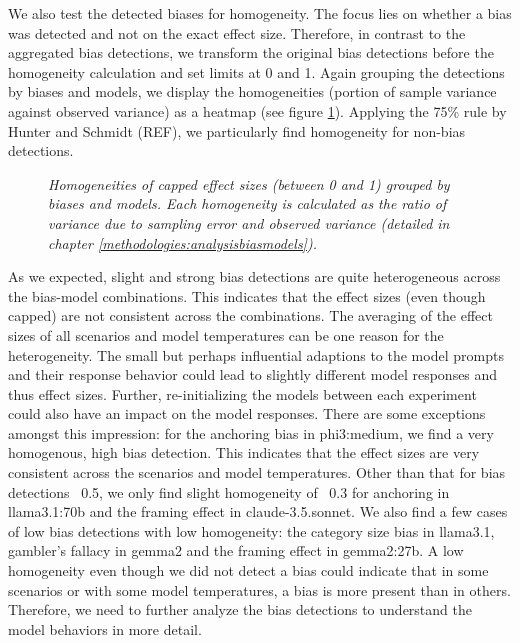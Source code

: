 \par We also test the detected biases for homogeneity. The focus lies on whether a bias was detected and not on the exact effect size. Therefore, in contrast to the aggregated bias detections, we transform the original bias detections before the homogeneity calculation and set limits at 0 and 1. Again grouping the detections by biases and models, we display the homogeneities (portion of sample variance against observed variance) as a heatmap (see figure \ref{fig:homogeneity-heatmap}). Applying the 75\% rule by Hunter and Schmidt (REF), we particularly find homogeneity for non-bias detections.

\begin{figure}[htbp]
    \centering
    
    \caption[Heatmap of homogeneities grouped by biases and models]{\centering \textit{Homogeneities of capped effect sizes (between 0 and 1) grouped by biases and models. Each homogeneity is calculated as the ratio of variance due to sampling error and observed variance (detailed in chapter \ref{methodologies:analysisbiasmodels}).}}
    \label{fig:homogeneity-heatmap}
\end{figure}

\par As we expected, slight and strong bias detections are quite heterogeneous across the bias-model combinations. This indicates that the effect sizes (even though capped) are not consistent across the combinations. The averaging of the effect sizes of all scenarios and model temperatures can be one reason for the heterogeneity. The small but perhaps influential adaptions to the model prompts and their response behavior could lead to slightly different model responses and thus effect sizes. Further, re-initializing the models between each experiment could also have an impact on the model responses. There are some exceptions amongst this impression: for the anchoring bias in phi3:medium, we find a very homogenous, high bias detection. This indicates that the effect sizes are very consistent across the scenarios and model temperatures. Other than that for bias detections \geq\, 0.5, we only find slight homogeneity of \geq\, 0.3 for anchoring in llama3.1:70b and the framing effect in claude-3.5.sonnet. We also find a few cases of low bias detections with low homogeneity: the category size bias in llama3.1, gambler's fallacy in gemma2 and the framing effect in gemma2:27b. A low homogeneity even though we did not detect a bias could indicate that in some scenarios or with some model temperatures, a bias is more present than in others. Therefore, we need to further analyze the bias detections to understand the model behaviors in more detail.

